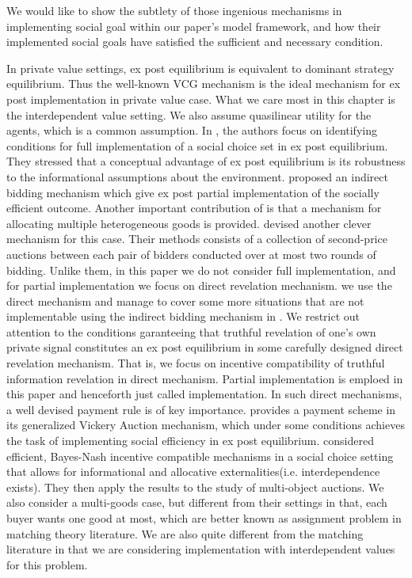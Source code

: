   We would like to show the subtlety of those ingenious mechanisms in 
 implementing social goal within our paper's model framework, and how their implemented social goals have satisfied the sufficient and 
 necessary condition.

  
 
 In private value settings, ex post equilibrium is equivalent to dominant strategy
 equilibrium. Thus the well-known VCG mechanism is the ideal mechanism for ex post implementation in private value case. What we care
 most in this chapter is the interdependent value setting. We also assume quasilinear utility for the agents, which is a common 
 assumption. 
In \parencite{BergemannM08}, the authors focus on identifying conditions for full implementation
 of a social choice set in ex post equilibrium. They stressed that a conceptual advantage of ex post equilibrium is its 
 robustness to the informational assumptions about the environment. \parencite{Maskin00} proposed an indirect bidding mechanism which
 give ex post partial implementation of the socially efficient outcome.
   Another important contribution of \parencite{Maskin00} is that a mechanism for allocating  multiple heterogeneous goods is 
 provided. \parencite{Perry2002} devised another clever mechanism for this case. Their methods consists of a collection of second-price 
 auctions between each pair of bidders conducted over at most two rounds of bidding. Unlike them, in this paper we do not consider 
 full implementation, and for partial implementation we focus on direct revelation mechanism. we use the direct mechanism and manage 
 to cover some more situations that are not implementable using the indirect bidding mechanism in \parencite{Maskin00}.
 We restrict out attention to the conditions garanteeing that truthful revelation of one's own private signal constitutes an ex post 
 equilibrium in some carefully designed direct revelation mechanism. That is, we focus on incentive compatibility of truthful
 information revelation in direct mechanism. Partial implementation is emploed in this paper and henceforth just called implementation.
 In such direct mechanisms,
 a well devised payment rule is of key importance. \parencite{Ausubel99} provides a payment scheme in its generalized Vickery Auction
 mechanism, which under some conditions achieves the task of implementing social efficiency in ex post equilibrium. 
 \parencite{Jehiel2001} considered efficient, Bayes-Nash incentive compatible mechanisms in a social choice setting that allows for informational and allocative externalities(i.e. interdependence exists). They then apply the results to the study of multi-object auctions. We also consider a multi-goods case, but different from their settings in that, each buyer wants one good at most, which are better known as assignment problem in matching theory literature\parencite{Roth1990}. We are also quite different from the matching literature in that we are considering implementation with interdependent values for this problem.

